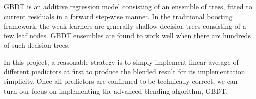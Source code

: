 \documentclass[10pt,twocolumn,letterpaper]{article}
\begin{document}
GBDT is an additive regression model consisting of an ensemble of trees,
fitted to current residuals in a forward step-wise manner. In the traditional
boosting framework, the weak learners are generally shallow decision trees
consisting of a few leaf nodes. GBDT ensembles are found to work well when
there are hundreds of such decision trees.

In this project, a reasonable strategy is to simply implement linear average of
different predictors at first to produce the blended result for its
implementation simplicity. Once all predictors are confirmed to be technically
correct, we can turn our focus on implementing the advanced blending
algorithm, GBDT.



{\small


}
\end{document}
